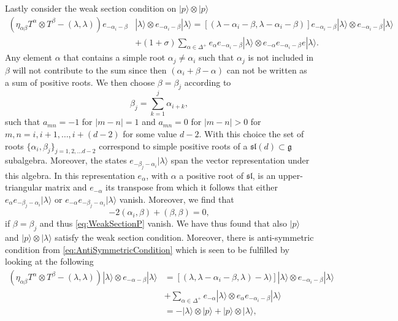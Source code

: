 Lastly consider the weak section condition on $|p\rangle\otimes|p\rangle$ 
\begin{equation}\label{eq:WeakSectionP}
    \begin{aligned}
    \left(\eta_{\alpha\beta}T^\alpha\otimes T^\beta-(\lambda,\lambda)\right)e_{-\alpha_i-\beta}&|\lambda\rangle \otimes e_{-\alpha_i-\beta}|\lambda\rangle = [(\lambda-\alpha_i-\beta,\lambda-\alpha_i-\beta)]e_{-\alpha_i-\beta}|\lambda\rangle\otimes e_{-\alpha_i-\beta}|\lambda\rangle\\
    &+(1+\sigma)\sum_{\alpha\in\Delta^{+}} e_{\alpha}e_{-\alpha_i-\beta}|\lambda\rangle\otimes e_{-\alpha}e_{-\alpha_i-\beta}e|\lambda\rangle.
    \end{aligned}
\end{equation}
Any element $\alpha$ that contains a simple root $\alpha_j\neq \alpha_i$ such that $\alpha_j$ is not included in $\beta$ will not contribute to the sum since then $(\alpha_i+\beta-\alpha)$ can not be written as a sum of positive roots. We then choose $\beta=\beta_j$ according to 
\begin{equation}
    \beta_j = \sum_{k=1}^j \alpha_{i+k},
\end{equation}
such that $a_{mn}=-1$ for $|m-n|=1$ and $a_{mn}=0$ for $|m-n|>0$ for $m,n=i,i+1,\ldots, i+(d-2)$ for some value $d-2$. With this choice the set of roots $\{\alpha_i,\beta_j\}_{j=1,2,\ldots d-2}$ correspond to simple positive roots of a $\mathfrak{sl}(d)\subset \mathfrak{g}$ subalgebra. Moreover, the states $e_{-\beta_j-\alpha_i}|\lambda\rangle$ span the vector representation under this algebra. In this representation $e_\alpha$, with $\alpha$ a positive root of $\mathfrak{sl}$, is an upper-triangular matrix and $e_{-\alpha}$ its transpose from which it follows that either $e_\alpha e_{-\beta_j-\alpha_i}|\lambda\rangle$ or $e_{-\alpha}e_{-\beta_j-\alpha_i}|\lambda\rangle$ vanish. Moreover, we find that 
\begin{equation}
    -2(\alpha_i,\beta)+(\beta,\beta)=0,
\end{equation}
if $\beta=\beta_j$ and thus \eqref{eq:WeakSectionP} vanish. We have thus found that also $|p\rangle$ and $|p\rangle\otimes|\lambda\rangle$ satisfy the weak section condition. 
Moreover, there is anti-symmetric condition from \eqref{eq:AntiSymmetricCondition} which is seen to be fulfilled by looking at the following 
\begin{equation}
    \begin{aligned}
    \left(\eta_{\alpha\beta}T^\alpha\otimes T^\beta-(\lambda,\lambda)\right)|\lambda\rangle \otimes e_{-\alpha-\beta}|\lambda\rangle &= [(\lambda,\lambda-\alpha_i-\beta,\lambda)-\lambda)]|\lambda\rangle\otimes e_{-\alpha_i-\beta}|\lambda\rangle \\
    &+\sum_{\alpha\in \Delta^+}e_{-\alpha}|\lambda\rangle \otimes e_{\alpha} e_{-\alpha_i-\beta}|\lambda\rangle\\
    &= -|\lambda\rangle \otimes |p\rangle +|p\rangle\otimes |\lambda\rangle,
    \end{aligned}
\end{equation}
